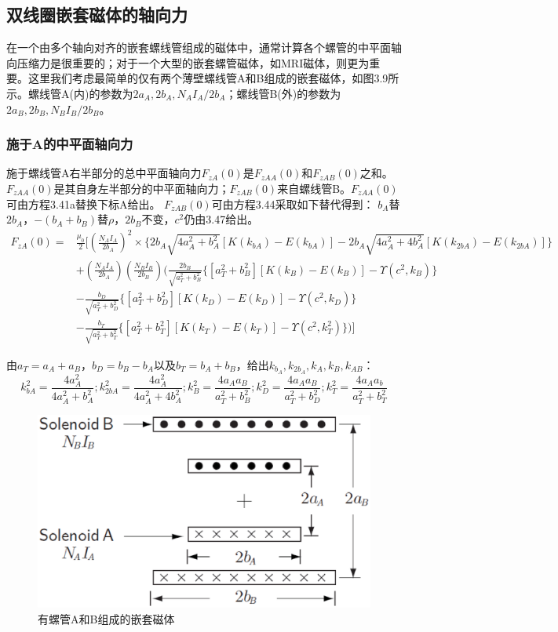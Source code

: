 \subsection{双线圈嵌套磁体的轴向力}
在一个由多个轴向对齐的嵌套螺线管组成的磁体中，通常计算各个螺管的中平面轴向压缩力是很重要的；对于一个大型的嵌套螺管磁体，如MRI磁体，则更为重要。这里我们考虑最简单的仅有两个薄壁螺线管A和B组成的嵌套磁体，如图3.9所示。螺线管A(内)的参数为$2a_A,2b_A,N_A I_A/2b_A$；螺线管B(外)的参数为$2a_B, 2b_B, N_B I_B/2b_B$。
\subsubsection{施于A的中平面轴向力}
施于螺线管A右半部分的总中平面轴向力$F_{zA}(0)$是$F_{zAA}(0)$和$F_{zAB}(0)$之和。$F_{zAA}(0)$是其自身左半部分的中平面轴向力；$F_{zAB}(0)$来自螺线管B。$F_{zAA}(0)$可由方程3.41a替换下标A给出。 $F_{zAB}(0)$可由方程3.44采取如下替代得到： $b_A$替$2b_A$，$−(b_A+b_B)$替$\rho$，$2b_B$不变，$c^2$仍由3.47给出。
\begin{equation}
\begin{split}
F_{zA}(0)=&\frac{\mu_0}{2}\bigg[(\frac{N_A I_A}{2b_A})^2\times \{2b_A\sqrt{4a_A^2+b_A^2}[K(k_{bA})-E(k_{bA})]-2b_A\sqrt{4a_A^2+4b_A^2}[K(k_{2bA})-E(k_{2bA})]\}\\
&+(\frac{N_AI_A}{2b_A})(\frac{N_BI_B}{2b_B})\big(\frac{2b_B}{\sqrt{a_T^2+b_B^2}}\{[a_T^2+b_B^2][K(k_B)-E(k_{B})]-\Upsilon(c^2,k_B)\}\\
&-\frac{b_D}{\sqrt{a_T^2+b_D^2}}\{{[a_T^2+b_D^2][K(k_D)-E(k_D)]-\Upsilon(c^2,k_D)}\}\\
&-\frac{b_T}{\sqrt{a_T^2+b_T^2}}\{[a_T^2+b_T^2][K(k_T)-E(k_T)]-\Upsilon(c^2,k_T^2)\}\big)\bigg]
\end{split}
\end{equation}

由$a_T=a_A+a_B$，$b_D=b_B-b_A$以及$b_T=b_A+b_B$，给出$k_{b_A}, k_{2b_A}, k_A,k_B, k_{AB}$：
$$ k_{bA}^2=\frac{4a_A^2}{4a_A^2+b_A^2}; k_{2bA}^2=\frac{4a_A^2}{4a_A^2+4b_A^2}; k_B^2=\frac{4a_Aa_B}{a_T^2+b_B^2};k_D^2=\frac{4a_Aa_B}{a_T^2+b_D^2}; k_T^2=\frac{4a_Aa_b}{a_T^2+b_T^2}$$

\begin{figure}[htbp]
  \centering
 \includegraphics[scale=0.4]{chpt3/figs/fig3.9.eps}
  \caption{有螺管A和B组成的嵌套磁体}
\end{figure}

